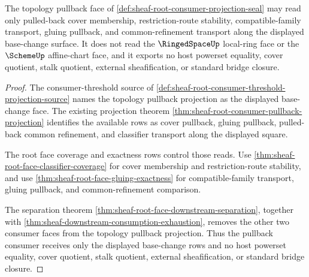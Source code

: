 \begin{theorem}
\label{thm:sheaf-root-topology-pullback-projection-seal}
The topology pullback face of \autoref{def:sheaf-root-consumer-projection-seal} may read only pulled-back cover membership, restriction-route stability, compatible-family transport, gluing pullback, and common-refinement transport along the displayed base-change surface. It does not read the $\RingedSpaceUp$ local-ring face or the $\SchemeUp$ affine-chart face, and it exports no host powerset equality, cover quotient, stalk quotient, external sheafification, or standard bridge closure.
\end{theorem}
\begin{proof}
The consumer-threshold source of \autoref{def:sheaf-root-consumer-threshold-projection-source} names the topology pullback projection as the displayed base-change face. The existing projection theorem \autoref{thm:sheaf-root-consumer-pullback-projection} identifies the available rows as cover pullback, gluing pullback, pulled-back common refinement, and classifier transport along the displayed square.

The root face coverage and exactness rows control those reads. Use \autoref{thm:sheaf-root-face-classifier-coverage} for cover membership and restriction-route stability, and use \autoref{thm:sheaf-root-face-gluing-exactness} for compatible-family transport, gluing pullback, and common-refinement comparison.

The separation theorem \autoref{thm:sheaf-root-face-downstream-separation}, together with \autoref{thm:sheaf-downstream-consumption-exhaustion}, removes the other two consumer faces from the topology pullback projection. Thus the pullback consumer receives only the displayed base-change rows and no host powerset equality, cover quotient, stalk quotient, external sheafification, or standard bridge closure.
\end{proof}
